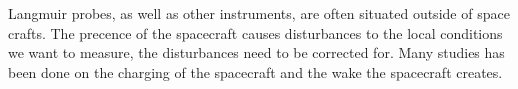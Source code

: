 
Langmuir probes, as well as other instruments, are often situated outside of space crafts.
The precence of the spacecraft causes disturbances to the local conditions we want to measure,
the disturbances need to be corrected for.
Many studies has been done on the charging of the spacecraft and the wake the
spacecraft creates.
